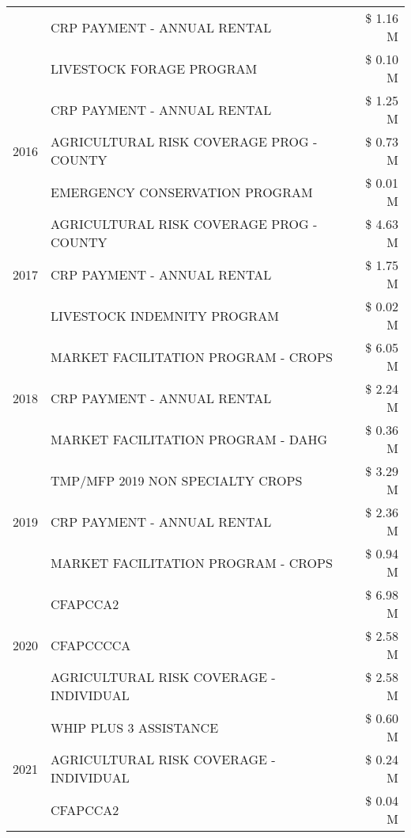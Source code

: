 \begin{tabular}{llr}
 & CRP PAYMENT - ANNUAL RENTAL & \$ 1.16 M \\
 & LIVESTOCK FORAGE PROGRAM & \$ 0.10 M \\
\cline{1-3}
\multirow[t]{3}{*}{2016} & CRP PAYMENT - ANNUAL RENTAL & \$ 1.25 M \\
 & AGRICULTURAL RISK COVERAGE PROG - COUNTY & \$ 0.73 M \\
 & EMERGENCY CONSERVATION PROGRAM & \$ 0.01 M \\
\cline{1-3}
\multirow[t]{3}{*}{2017} & AGRICULTURAL RISK COVERAGE PROG - COUNTY & \$ 4.63 M \\
 & CRP PAYMENT - ANNUAL RENTAL & \$ 1.75 M \\
 & LIVESTOCK INDEMNITY PROGRAM & \$ 0.02 M \\
\cline{1-3}
\multirow[t]{3}{*}{2018} & MARKET FACILITATION PROGRAM - CROPS & \$ 6.05 M \\
 & CRP PAYMENT - ANNUAL RENTAL & \$ 2.24 M \\
 & MARKET FACILITATION PROGRAM - DAHG & \$ 0.36 M \\
\cline{1-3}
\multirow[t]{3}{*}{2019} & TMP/MFP 2019 NON SPECIALTY CROPS & \$ 3.29 M \\
 & CRP PAYMENT - ANNUAL RENTAL & \$ 2.36 M \\
 & MARKET FACILITATION PROGRAM - CROPS & \$ 0.94 M \\
\cline{1-3}
\multirow[t]{3}{*}{2020} & CFAPCCA2 & \$ 6.98 M \\
 & CFAPCCCCA & \$ 2.58 M \\
 & AGRICULTURAL RISK COVERAGE - INDIVIDUAL & \$ 2.58 M \\
\cline{1-3}
\multirow[t]{3}{*}{2021} & WHIP PLUS 3 ASSISTANCE & \$ 0.60 M \\
 & AGRICULTURAL RISK COVERAGE - INDIVIDUAL & \$ 0.24 M \\
 & CFAPCCA2 & \$ 0.04 M \\
\cline{1-3}
\bottomrule
\end{tabular}
